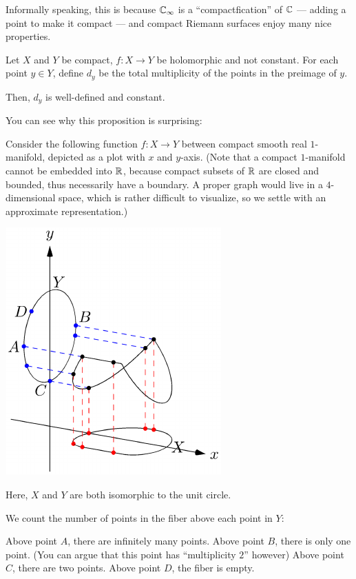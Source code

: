 Informally speaking, this is because $\mathbb C_\infty$ is a ``compactfication'' of $\mathbb C$ --- adding a
point to make it compact --- and compact Riemann surfaces enjoy many nice properties.

\begin{proposition}
	Let $X$ and $Y$ be compact, $f \colon X \to Y$ be holomorphic and not constant.
	For each point $y \in Y$, define $d_y$ be the total multiplicity of the points in the preimage
	of $y$.

	Then, $d_y$ is well-defined and constant.
\end{proposition}

You can see why this proposition is surprising:
\begin{example}
	Consider the following function $f \colon X \to Y$ between compact smooth real $1$-manifold,
	depicted as a plot with $x$ and $y$-axis.
	(Note that a compact $1$-manifold cannot be embedded into $\mathbb R$, because compact subsets of
	$\mathbb R$ are closed and bounded, thus necessarily have a boundary. A proper graph would live in a
	$4$-dimensional space, which is rather difficult to visualize, so we settle with an approximate
	representation.)

	\begin{center}
		\includegraphics{3dfigures/pdf/morphism-scm-counterexample.pdf}
	\end{center}

	Here, $X$ and $Y$ are both isomorphic to the unit circle.

	We count the number of points in the fiber above each point in $Y$:
	\begin{itemize}
		\ii Above point $A$, there are infinitely many points.
		\ii Above point $B$, there is only one point. (You can argue that this point has
		``multiplicity $2$'' however)
		\ii Above point $C$, there are two points.
		\ii Above point $D$, the fiber is empty.
	\end{itemize}
\end{example}

